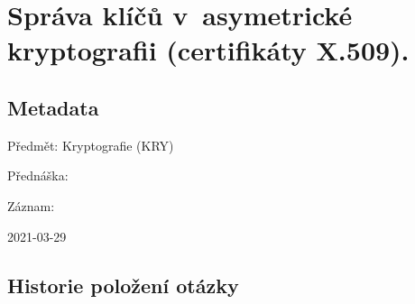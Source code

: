 

\graphicspath{{kry/sprava_klicu_v_asymetricke}}


\chapter{Správa klíčů v~asymetrické kryptografii (certifikáty X.509).}


\section{Metadata}

\begin{compactitem}
    \item Předmět: Kryptografie (KRY)
    \item Přednáška:
    \begin{compactitem}
        \item {}
    \end{compactitem}
    \item Záznam:
    \begin{compactitem}
        \item 2021-03-29
    \end{compactitem}
\end{compactitem}


\section{Historie položení otázky}


